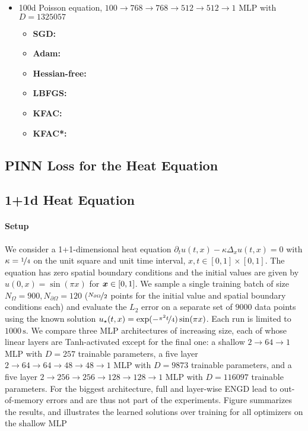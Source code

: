 \begin{itemize}
\item 100d Poisson equation, $100 \to 768 \to 768 \to 512 \to 512 \to 1$ MLP with $D=\num{1325057}$
  \begin{itemize}
    \def\pathToRuns{kfac_pinns_exp/exp14_poisson_100d_weinan/tex}
  \item \textbf{SGD:} 
  \item \textbf{Adam:} 
  \item \textbf{Hessian-free:} 
  \item \textbf{LBFGS:} 
  \item \textbf{KFAC:} 
  \item \textbf{KFAC*:} 
  \end{itemize}
\end{itemize}

\subsection{PINN Loss for the Heat Equation}\label{sec:pinn-loss-heat-equation}


\subsection{1+1d Heat Equation}\label{sec:1d-heat-equation}

\paragraph{Setup} We consider a 1+1-dimensional heat equation $\partial_tu(t,x) - \kappa \Delta_{x} u(t, x) = 0$ with $\kappa = \nicefrac{1}{4}$ on the unit square and unit time interval, $x, t \in [0,1] \times [0,1]$.
The equation has zero spatial boundary conditions and the initial values are given by $u(0, x) = \sin(\pi x)$ for ${\bm{x}} \in [0,1]$.
We sample a single training batch of size $N_{\Omega} = \num{900}, N_{\partial\Omega} = 120$ ($\nicefrac{N_{\partial\Omega}}{2}$ points for the initial value and spatial boundary conditions each) and evaluate the $L_2$ error on a separate set of $\num{9000}$ data points using the known solution $u_{\star}(t, x) = \exp(-\nicefrac{\pi^2t}{4}) \sin(\pi x)$.
Each run is limited to $\num{1000}\,\text{s}$. We compare three MLP architectures of increasing size, each of whose linear layers are Tanh-activated except for the final one: a shallow $2\to 64\to 1$ MLP with $D=257$ trainable parameters, a five layer $2 \to 64 \to 64 \to 48 \to 48 \to 1$ MLP with $D=\num{9873}$ trainable parameters, and a five layer $2 \to 256 \to 256\to 128 \to 128 \to 1$ MLP with $D=\num{116097}$ trainable parameters.
For the biggest architecture, full and layer-wise ENGD lead to out-of-memory errors and are thus not part of the experiments.
Figure  summarizes the results, and  illustrates the learned solutions over training for all optimizers on the shallow MLP

